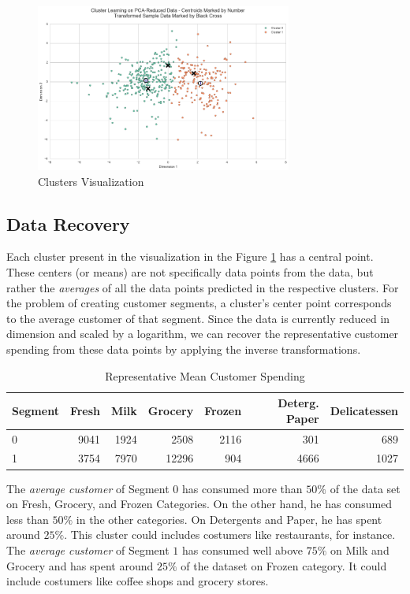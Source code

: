 \documentclass[a4paper]{article}
\begin{document}
\begin{figure}[ht!]
\centering
\includegraphics[width=0.75\textwidth]{figures/clustering_1.png}
\caption{\label{fig:clustering_1}Clusters Visualization}
\end{figure}

\subsection{Data Recovery}

Each cluster present in the visualization in the Figure \ref{fig:clustering_1} has a central point. These centers (or means) are not specifically data points from the data, but rather the \textit{averages} of all the data points predicted in the respective clusters. For the problem of creating customer segments, a cluster's center point corresponds to the average customer of that segment. Since the data is currently reduced in dimension and scaled by a logarithm, we can recover the representative customer spending from these data points by applying the inverse transformations.


\begin{table}[ht!]
\centering
\begin{tabular}{l|rrrrrr}
{Segment} &  Fresh &  Milk &  Grocery &  Frozen &  Deterg. Paper &  Delicatessen \\\hline
0 &   9041 &  1924 &     2508 &    2116 &               301 &           689 \\
1 &   3754 &  7970 &    12296 &     904 &              4666 &          1027 \\

\end{tabular}
\caption{\label{tab:centrois_Recov}Representative Mean Customer Spending}
\end{table}

The \textit{average customer} of Segment $0$ has consumed more than $50\%$ of the data set on Fresh, Grocery, and Frozen Categories. On the other hand, he has consumed less than $50\%$ in the other categories. On Detergents and Paper, he has spent around $25\%$. This cluster could includes costumers like restaurants, for instance. The \textit{average customer} of Segment $1$ has consumed well above $75\%$ on Milk and Grocery and has spent around $25\%$ of the dataset on Frozen category. It could include costumers like coffee shops and grocery stores.
\end{document}
